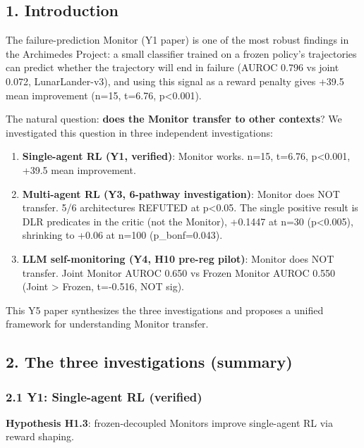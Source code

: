 \documentclass[
]{article}
\begin{document}
\subsection{1. Introduction}\label{introduction}

The failure-prediction Monitor (Y1 paper) is one of the most robust
findings in the Archimedes Project: a small classifier trained on a
frozen policy's trajectories can predict whether the trajectory will end
in failure (AUROC 0.796 vs joint 0.072, LunarLander-v3), and using this
signal as a reward penalty gives +39.5 mean improvement (n=15, t=6.76,
p\textless0.001).

The natural question: \textbf{does the Monitor transfer to other
contexts}? We investigated this question in three independent
investigations:

\begin{enumerate}
\def\labelenumi{\arabic{enumi}.}
\item
  \textbf{Single-agent RL (Y1, verified)}: Monitor works. n=15, t=6.76,
  p\textless0.001, +39.5 mean improvement.
\item
  \textbf{Multi-agent RL (Y3, 6-pathway investigation)}: Monitor does
  NOT transfer. 5/6 architectures REFUTED at p\textless0.05. The single
  positive result is DLR predicates in the critic (not the Monitor),
  +0.1447 at n=30 (p\textless0.005), shrinking to +0.06 at n=100
  (p\_bonf=0.043).
\item
  \textbf{LLM self-monitoring (Y4, H10 pre-reg pilot)}: Monitor does NOT
  transfer. Joint Monitor AUROC 0.650 vs Frozen Monitor AUROC 0.550
  (Joint \textgreater{} Frozen, t=-0.516, NOT sig).
\end{enumerate}

This Y5 paper synthesizes the three investigations and proposes a
unified framework for understanding Monitor transfer.

\subsection{2. The three investigations
(summary)}\label{the-three-investigations-summary}

\subsubsection{2.1 Y1: Single-agent RL
(verified)}\label{y1-single-agent-rl-verified}

\textbf{Hypothesis H1.3}: frozen-decoupled Monitors improve single-agent
RL via reward shaping.
\end{document}
